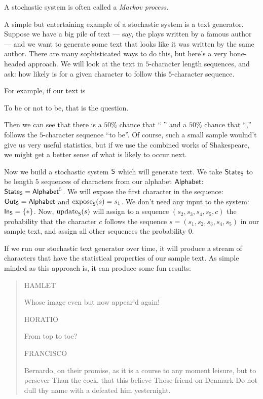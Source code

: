 \documentclass[DynamicalBook]{subfiles}
\begin{document}
\begin{remark}
 A stochastic system is often called a \emph{Markov process}. 
\end{remark}

\begin{example}\label{ex.markov_text_generator}
  A simple but entertaining example of a stochastic system is a text generator.
  Suppose we have a big pile of text --- say, the plays written by a famous author
  --- and we want to generate some text that looks like it was written by the
  same author. There are many sophisticated ways to do this, but here's a very
  bone-headed approach. We will look at the text in $5$-character length
  sequences, and ask: how likely is for a given character to follow this
  $5$-character sequence.

  For example, if our text is
  \begin{center}
To be or not to be, that is the question.
  \end{center}
Then we can see that there is a $50\%$ chance that `` '' and a $50\%$ chance
that ``,'' follows the $5$-character sequence ``to be''. Of course, such a small
sample woulnd't give us very useful statistics, but if we use the combined works
of Shakespeare, we might get a better sense of what is likely to occur next.

Now we build a stochastic system $\mathsf{S}$ which will generate text. We take
$\mathsf{State}_{\mathsf{S}}$ to be length $5$ sequences of characters from our alphabet
$\mathsf{Alphabet}$: $\mathsf{State}_{\mathsf{S}} = \mathsf{Alphabet}^5$. We will
expose the first character in the sequence: $\mathsf{Out}_{\mathsf{S}} = \mathsf{Alphabet}$ and $\mathrm{expose}_{\mathsf{S}}(s) = s_1$. We don't need any
input to the system: $\mathsf{In}_{\mathsf{S}} = \{\ast\}$. Now, $\mathrm{update}_{\mathsf{S}}(s)$ will assign to a
sequence $(s_2, s_3, s_4, s_5, c)$ the probability that the character $c$
follows the sequence $s = (s_1, s_2, s_3, s_4, s_5)$ in our sample text, and
assign all other sequences the probability $0$.

If we run our stochastic text generator over time, it will produce a stream of
characters that have the statistical properties of our sample text. As simple
minded as this approach is, it can produce some fun results:
\begin{quote}
  HAMLET

    Whose image even but now appear'd again!

HORATIO

    From top to toe?

FRANCISCO

    Bernardo, on their promise, as it is a course to any moment leisure, but to persever
    Than the cock, that this believe
    Those friend on Denmark
    Do not dull thy name with a defeated him yesternight.
\end{quote}


\end{example}
\end{document}
